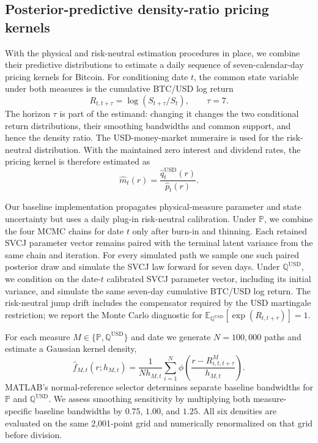 \subsection{Posterior-predictive density-ratio pricing kernels}
\label{subsec:pk-density-method}

With the physical and risk-neutral estimation procedures in place, we combine
their predictive distributions to estimate a daily sequence of
seven-calendar-day pricing kernels for Bitcoin.
For conditioning date $t$, the common state variable under both measures is the
cumulative BTC/USD log return
\begin{equation}
    R_{t,t+\tau}=\log(S_{t+\tau}/S_t), \qquad \tau=7.
\end{equation}
The horizon $\tau$ is part of the estimand: changing it changes the two
conditional return distributions, their smoothing bandwidths and common
support, and hence the density ratio. The USD-money-market numeraire is used
for the risk-neutral distribution. With the maintained zero interest and
dividend rates, the pricing kernel is therefore estimated as
\begin{equation}
    \widehat m_t(r)=
    \frac{\widehat q^{\mathrm{USD}}_t(r)}{\widehat p_t(r)}.
    \label{eq:pk-density-ratio}
\end{equation}

Our baseline implementation propagates physical-measure
parameter and state uncertainty but uses a daily plug-in risk-neutral
calibration. Under $\mathbb{P}$, we combine the four MCMC chains for date $t$ only after
burn-in and thinning. Each retained SVCJ parameter vector remains paired with
the terminal latent variance from the same chain and iteration. For every
simulated path we sample one such paired posterior draw and simulate the SVCJ
law forward for seven days. Under $\mathbb{Q}^{\mathrm{USD}}$, we condition on the
date-$t$ calibrated SVCJ parameter vector, including its initial variance, and
simulate the same seven-day cumulative BTC/USD log return. The risk-neutral
jump drift includes the compensator required by the USD martingale restriction;
we report the Monte Carlo diagnostic for
$\mathbb{E}_{\mathbb{Q}^{\mathrm{USD}}}[\exp(R_{t,t+\tau})]=1$.

For each measure $M\in\{\mathbb{P},\mathbb{Q}^{\mathrm{USD}}\}$ and date we generate
$N=100{,}000$ paths and estimate a Gaussian kernel density,
\begin{equation}
    \widehat f_{M,t}(r;h_{M,t})=
    \frac{1}{N h_{M,t}}\sum_{i=1}^{N}
    \phi\!\left(\frac{r-R^{M}_{i,t,t+\tau}}{h_{M,t}}\right).
    \label{eq:pk-kde}
\end{equation}
MATLAB's normal-reference selector determines separate baseline bandwidths for
$\mathbb{P}$ and $\mathbb{Q}^{\mathrm{USD}}$. We assess smoothing sensitivity by multiplying
both measure-specific baseline bandwidths by $0.75$, $1.00$, and $1.25$. All
six densities are evaluated on the same 2,001-point grid and numerically
renormalized on that grid before division.


